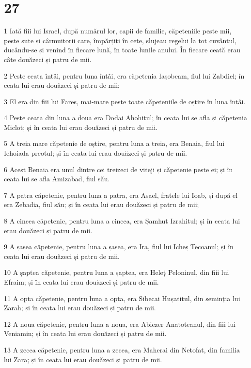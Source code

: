 \chapter{27}

\par 1 Iată fiii lui Israel, după numărul lor, capii de familie, căpeteniile peste mii, peste sute și cârmuitorii care, împărțiți în cete, slujeau regelui la tot cuvântul, ducându-se și venind în fiecare lună, în toate lunile anului. În fiecare ceată erau câte douăzeci și patru de mii.
\par 2 Peste ceata întâi, pentru luna întâi, era căpetenia Iașobeam, fiul lui Zabdiel; în ceata lui erau douăzeci și patru de mii;
\par 3 El era din fiii lui Fares, mai-mare peste toate căpeteniile de oștire în luna întâi.
\par 4 Peste ceata din luna a doua era Dodai Ahohitul; în ceata lui se afla și căpetenia Miclot; și în ceata lui erau douăzeci și patru de mii.
\par 5 A treia mare căpetenie de oștire, pentru luna a treia, era Benaia, fiul lui Iehoiada preotul; și în ceata lui erau douăzeci și patru de mii.
\par 6 Acest Benaia era unul dintre cei treizeci de viteji și căpetenie peste ei; și în ceata lui se afla Amizabad, fiul său.
\par 7 A patra căpetenie, pentru luna a patra, era Asael, fratele lui Ioab, și după el era Zebadia, fiul său; și în ceata lui erau douăzeci și patru de mii;
\par 8 A cincea căpetenie, pentru luna a cincea, era Șamhut Izrahitul; și în ceata lui erau douăzeci și patru de mii.
\par 9 A șasea căpetenie, pentru luna a șasea, era Ira, fiul lui Icheș Tecoanul; și în ceata lui erau douăzeci și patru de mii.
\par 10 A șaptea căpetenie, pentru luna a șaptea, era Heleț Peloninul, din fiii lui Efraim; și în ceata lui erau douăzeci și patru de mii.
\par 11 A opta căpetenie, pentru luna a opta, era Sibecai Hușatitul, din seminția lui Zarah; și în ceata lui erau douăzeci și patru de mii.
\par 12 A noua căpetenie, pentru luna a noua, era Abiezer Anatoteanul, din fiii lui Veniamin; și în ceata lui erau douăzeci și patru de mii.
\par 13 A zecea căpetenie, pentru luna a zecea, era Maherai din Netofat, din familia lui Zara; și în ceata lui erau douăzeci și patru de mii.
